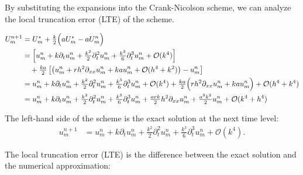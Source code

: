 By substituting the expansions into the Crank-Nicolson scheme, we can analyze the local truncation error (LTE) of the scheme.

\begin{align*}
  U_m^{n+1} & = U_m^\star + \tfrac{k}{2} \Bigl( aU_m^\star - aU_m^n \Bigr)                                                                                                                                               \\
            & = \left[ u_m^n + k\partial_t u_m^n + \tfrac{k^2}{2}\partial_t^2 u_m^n + \tfrac{k^3}{6}\partial_t^3 u_m^n + \mathcal{O}(k^4) \right]                                                                      \\
            & \quad {}+ \tfrac{ka}{2}\left[\left( u_m^n + rh^2\partial_{xx} u_m^n + kau_m^n + \mathcal{O}(h^4+k^2) \right) - u_m^n \right]                                                                               \\
            & = u_m^n + k\partial_t u_m^n + \tfrac{k^2}{2}\partial_t^2 u_m^n + \tfrac{k^3}{6}\partial_t^3 u_m^n + \mathcal{O}(k^4) + \tfrac{ka}{2}\Bigl( rh^2\partial_{xx} u_m^n + kau_m^n \Bigr) + \mathcal{O}(h^4+k^4) \\
            & = u_m^n + k\partial_t u_m^n + \tfrac{k^2}{2}\partial_t^2 u_m^n
  + \tfrac{k^3}{6}\partial_t^3 u_m^n
  + \tfrac{ark}{2}h^2\partial_{xx} u_m^n + \tfrac{a^2k^2}{2}u_m^n
  + \mathcal{O}(k^4+h^4)
\end{align*}

The left-hand side of the scheme is the exact solution at the next time level:
\begin{align*}
  u_m^{n+1} & = u_m^n + k\partial_t u_m^n + \tfrac{k^2}{2}\partial_t^2 u_m^n + \tfrac{k^3}{6}\partial_t^3 u_m^n + \mathcal{O}(k^4).
\end{align*}

The local truncation error (LTE) is the difference between the exact solution and the numerical approximation:

